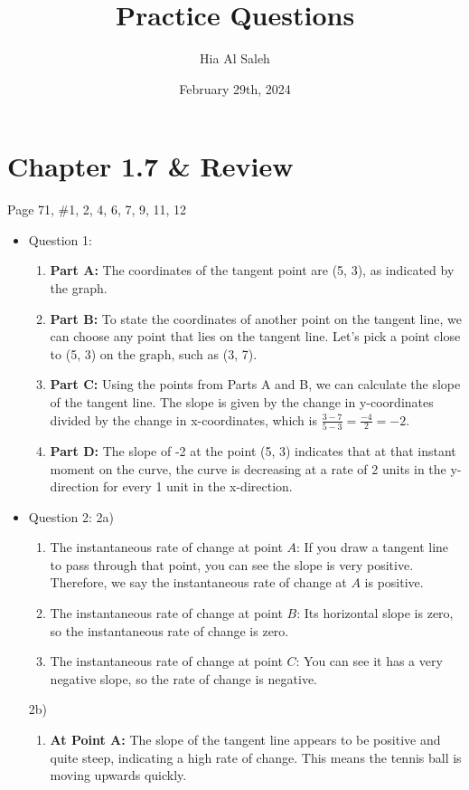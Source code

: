 \documentclass{article}
\title{Practice Questions}
\author{Hia Al Saleh}
\date{February 29th, 2024}
\begin{document}
\maketitle
\section*{Chapter 1.7 \& Review}
Page 71, \#1, 2, 4, 6, 7, 9, 11, 12
\begin{itemize}
\item Question 1:
\begin{enumerate}
    \item \textbf{Part A:} The coordinates of the tangent point are (5, 3), as indicated by the graph.
    
    \item \textbf{Part B:} To state the coordinates of another point on the tangent line, we can choose any point that lies on the tangent line. Let's pick a point close to (5, 3) on the graph, such as (3, 7).
    
    \item \textbf{Part C:} Using the points from Parts A and B, we can calculate the slope of the tangent line. The slope is given by the change in y-coordinates divided by the change in x-coordinates, which is \(\frac{3 - 7}{5 - 3} = \frac{-4}{2} = -2\).
    
    \item \textbf{Part D:} The slope of -2 at the point (5, 3) indicates that at that instant moment on the curve, the curve is decreasing at a rate of 2 units in the y-direction for every 1 unit in the x-direction.
\end{enumerate}

\item Question 2:
2a)
\begin{enumerate}
    \item The instantaneous rate of change at point \(A\): If you draw a tangent line to pass through that point, you can see the slope is very positive. Therefore, we say the instantaneous rate of change at \(A\) is positive.
    
    \item The instantaneous rate of change at point \(B\): Its horizontal slope is zero, so the instantaneous rate of change is zero.
    
    \item The instantaneous rate of change at point \(C\): You can see it has a very negative slope, so the rate of change is negative.
\end{enumerate}
2b)
\begin{enumerate}
    \item \textbf{At Point A:} The slope of the tangent line appears to be positive and quite steep, indicating a high rate of change. This means the tennis ball is moving upwards quickly.
    

\end{enumerate}
\end{itemize}
\end{document}
